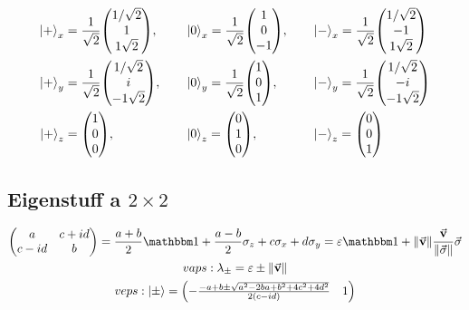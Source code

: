 \begin{alignat*}{3}
	\ket{+}_{x} &= \frac{1}{\sqrt{2}} \mqty(1/\sqrt{2} \\ 1 \\ 1\sqrt{2}) \qc && \ket{0}_{x} = \frac{1}{\sqrt{2}} \mqty(1 \\ 0 \\ -1) \qc && \ket{-}_{x} = \frac{1}{\sqrt{2}} \mqty(1/\sqrt{2} \\ -1 \\ 1\sqrt{2}) \\
	\ket{+}_{y} &= \frac{1}{\sqrt{2}} \mqty(1/\sqrt{2} \\ i \\ -1\sqrt{2}) \qc && \ket{0}_{y} = \frac{1}{\sqrt{2}} \mqty(1 \\ 0 \\ 1) \qc && \ket{-}_{y} = \frac{1}{\sqrt{2}} \mqty(1/\sqrt{2} \\ -i \\ -1\sqrt{2}) \\
	\ket{+}_{z} &= \mqty(1 \\ 0 \\ 0) \qc && \ket{0}_{z} = \mqty(0 \\ 1 \\ 0) \qc && \ket{-}_{z} = \mqty(0 \\ 0 \\ 1) \\
\end{alignat*}

\subsection{Eigenstuff a $2\times2$}
\begin{align*}
\begin{gathered}
	\mqty(a & c + id \\ c - id & b) = \frac{a+b}{2} \bbid + \frac{a-b}{2} \sigma_{z} + c \sigma_{x} + d \sigma_{y} = \varepsilon \bbid + \norm{\va{v}} \frac{\va{v}}{\norm{\va{\sigma}}} \va{\sigma} \\
	vaps: \lambda_{\pm} = \varepsilon \pm \norm{\va{v}} \\
	veps: \ket{\pm} = \mqty(-\frac{-a + b \pm \sqrt{a^2 - 2ba + b^2 + 4c^2 + 4d^2}}{2 (c - i d)} & 1)
\end{gathered}
\end{align*}
